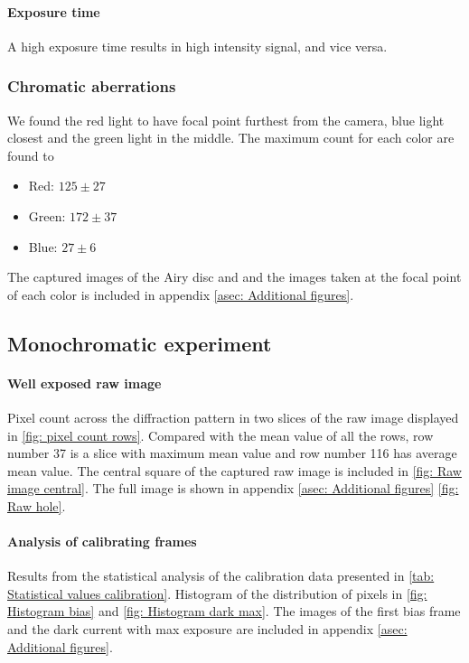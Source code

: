 \documentclass{emulateapj}
\begin{document}
\paragraph{Exposure time}
A high exposure time results in high intensity signal, and vice versa.

\subsubsection{Chromatic aberrations}
We found the red light to have focal point furthest from the camera, blue light closest and the green light in the middle. The maximum count for each color are found to
\begin{itemize}
	\item Red: $125 \pm 27$
	\item Green: $172 \pm 37$
	\item Blue: $27 \pm 6$
\end{itemize}
The captured images of the Airy disc and and the images taken at the focal point of each color is included in appendix \ref{asec: Additional figures}.

\subsection{Monochromatic experiment}
\label{subsec: Results/ mono exp}

\paragraph{Well exposed raw image}
Pixel count across the diffraction pattern in two slices of the raw image displayed in \cref{fig: pixel count rows}. Compared with the mean value of all the rows, row number 37 is a slice with maximum mean value and row number 116 has average mean value. The central square of the captured raw image is included in \cref{fig: Raw image central}. The full image is shown in appendix \ref{asec: Additional figures} \cref{fig: Raw hole}.

\paragraph{Analysis of calibrating frames}
Results from the statistical analysis of the calibration data presented in \cref{tab: Statistical values calibration}. Histogram of the distribution of pixels in \cref{fig: Histogram bias} and \cref{fig: Histogram dark max}. The images of the first bias frame and the dark current with max exposure are included in appendix \ref{asec: Additional figures}.
\end{document}
